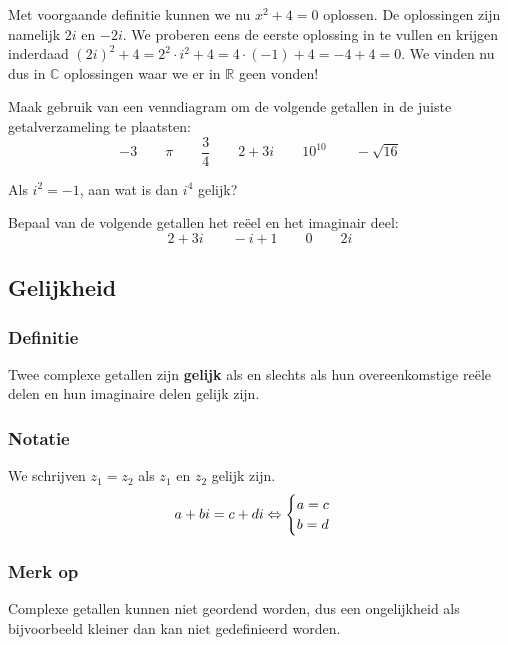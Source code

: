 \documentclass[12pt,twoside,a4paper]{article}
\begin{document}
Met voorgaande definitie kunnen we nu $x^2+4=0$ oplossen. De oplossingen zijn namelijk $2i$ en $-2i$. We proberen eens de eerste oplossing in te vullen en krijgen inderdaad $(2i)^2+4 = 2^2\cdot i^2 + 4 = 4\cdot(-1) + 4 = -4 + 4 = 0$. We vinden nu dus in $\mathbb{C}$ oplossingen waar we er in $\mathbb{R}$ geen vonden!

\begin{oefening}
  Maak gebruik van een venndiagram om de volgende getallen in de juiste getalverzameling te plaatsten:
  $$-3\qquad\pi\qquad\dfrac{3}{4}\qquad2+3i\qquad10^{10}\qquad-\sqrt{16}$$
\end{oefening}

\begin{oefening}
  Als $i^2=-1$, aan wat is dan $i^4$ gelijk?
\end{oefening}

\begin{oefening}
  Bepaal van de volgende getallen het reëel en het imaginair deel:
  $$2+3i\qquad -i+1\qquad 0 \qquad 2i$$
\end{oefening}

\subsection{Gelijkheid}

\subsubsection*{Definitie}
\begin{mdframed}
Twee complexe getallen zijn {\bf gelijk} als en slechts als hun overeenkomstige reële delen en hun imaginaire delen gelijk zijn.
\end{mdframed}

\subsubsection*{Notatie}
We schrijven $z_1=z_2$ als $z_1$ en $z_2$ gelijk zijn.
$$a+bi = c+di \Leftrightarrow \begin{cases}a=c \\ b=d\end{cases}$$

\subsubsection*{Merk op}
Complexe getallen kunnen niet geordend worden, dus een ongelijkheid als bijvoorbeeld kleiner dan kan niet gedefinieerd worden.
\end{document}
